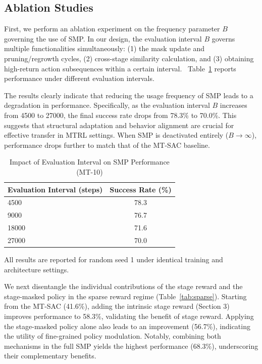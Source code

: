 \documentclass{article}
\begin{document}
\subsection{Ablation Studies}

First, we perform an ablation experiment on the frequency parameter $B$ governing the use of SMP. 
In our design, the evaluation interval $B$ governs multiple functionalities simultaneously: (1) the mask update and pruning/regrowth cycles, (2) cross-stage similarity calculation, and (3) obtaining high-return action subsequences within a certain interval.  
Table~\ref{tab:eval_interval} reports performance under different evaluation intervals. 

The results clearly indicate that reducing the usage frequency of SMP leads to a degradation in performance. 
Specifically, as the evaluation interval $B$ increases from 4500 to 27000, the final success rate drops from 78.3\% to 70.0\%. 
This suggests that structural adaptation and behavior alignment are crucial for effective transfer in MTRL settings. When SMP is deactivated entirely ($B \to \infty$), performance drops further to match that of the MT-SAC baseline.


\begin{table}[htbp]
\centering

\begin{threeparttable}
\begin{tabular}{lc}
\toprule
\textbf{Evaluation Interval (steps)} & \textbf{Success Rate (\%)} \\
\midrule
4500 & 78.3 \\
9000 & 76.7 \\
18000 & 71.6 \\
27000 & 70.0 \\
\bottomrule
\end{tabular}
\caption{Impact of Evaluation Interval on SMP Performance (MT-10)}
\label{tab:eval_interval}
\begin{tablenotes}[flushleft]
\footnotesize
\item All results are reported for random seed 1 under identical training and architecture settings.
\end{tablenotes}
\end{threeparttable}
\end{table}



We next disentangle the individual contributions of the stage reward and the stage-masked policy in the sparse reward regime (Table~\ref{tab:sparse}).
Starting from the MT-SAC (41.6\%), adding the intrinsic stage reward (Section 3) improves performance to 58.3\%, validating the benefit of stage reward. 
Applying the stage-masked policy alone also leads to an improvement (56.7\%), indicating the utility of fine-grained policy modulation. 
Notably, combining both mechanisms in the full SMP yields the highest performance (68.3\%), underscoring their complementary benefits.
\end{document}
